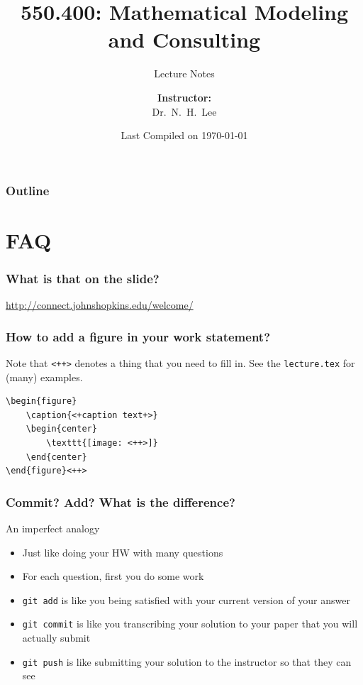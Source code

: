 \documentclass[hyperref={colorlinks=false},handout,10pt]{beamer}
\title{{\color{blue} \LARGE 550.400: Mathematical Modeling and Consulting\newline} }
\subtitle{{\color{red} \large Lecture Notes} }
\author{ 
    {\bf{Instructor:}} \\ 
Dr.~N.~H.~Lee \\ 
    \vspace{5pt}
}
\institute{JHU AMS 2012 FALL}
\date{\mygreen Last Compiled on \today}
\let\olditem\item
\renewcommand{\item}{\setlength{\itemsep}{0.5\baselineskip}\olditem}
\begin{document}
\begin{frame}[plain]
  \titlepage
\end{frame}

\begin{frame}%
  \frametitle{Outline}
  \tableofcontents
\end{frame}

\section{FAQ} 

\begin{frame}
    \frametitle{What is that on the slide?}
    \begin{center}
        \Large
        \href{http://connect.johnshopkins.edu/welcome/}{http://connect.johnshopkins.edu/welcome/}
\end{center}
\end{frame}




\begin{frame}[fragile]
    \frametitle{How to add a figure in your work statement?}
        Note that \verb$<++>$ denotes a thing that you need to fill in.
        See the \texttt{lecture.tex} for (many) examples.
        \vskip0.1in
    \begin{lstlisting}
\begin{figure}
    \caption{<+caption text+>}
    \begin{center}
        \texttt{[image: <++>]}
    \end{center}
\end{figure}<++>
    \end{lstlisting}
\end{frame}

\begin{frame}
    \frametitle{Commit? Add? What is the difference?}
    \begin{block}{An imperfect analogy}
        \begin{itemize}
            \item Just like doing your HW with many questions
            \item For each question, first you do some work
            \item \texttt{git add} is like you being satisfied with your current
                version of your answer
            \item \texttt{git commit} is like you transcribing your solution to your
                paper that you will actually submit
            \item \texttt{git push} is like submitting your solution to the
                instructor so that they can see
        \end{itemize}
    \end{block}
\end{frame}
\end{document}

